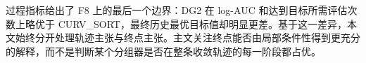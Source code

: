 过程指标给出了 F8 上的最后一个边界：DG2 在 log-AUC 和达到目标所需评估次数上略优于 CURV\_SORT，最终历史最优目标值却明显更差。基于这一差异，本文始终分开处理轨迹主张与终点主张。主文关注终点能否由局部条件性得到更充分的解释，而不是判断某个分组器是否在整条收敛轨迹的每一阶段都占优。